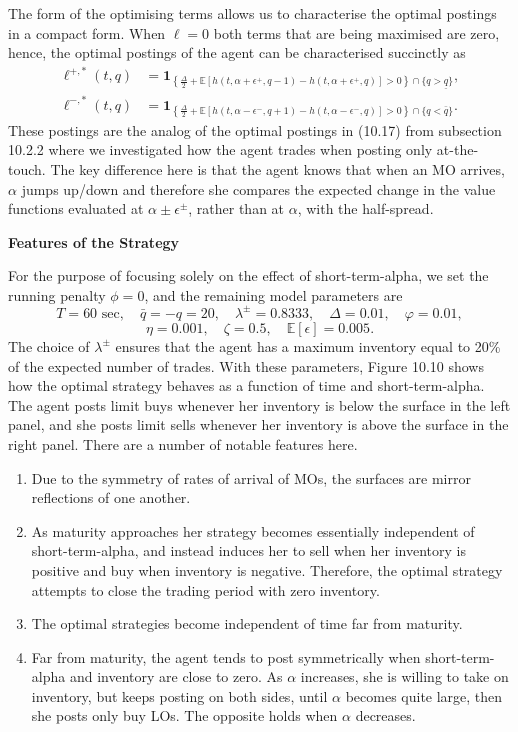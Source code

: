 \documentclass[11pt, a4paper]{book}
\newcommand{\E}{\mathbb{E}}
\newcommand{\Ind}{\mathbf{1}}
\begin{document}
	The form of the optimising terms allows us to characterise the optimal postings in a compact form. When $\ell = 0$ both terms that are being maximised are zero, hence, the optimal postings of the agent can be characterised succinctly as
	\begin{equation}
		\boxed{
			\begin{aligned}
				\ell^{+, *}(t, q) &= \Ind_{\left\{ \frac{\Delta}{2} + \E[h(t, \alpha + \epsilon^+, q-1) - h(t, \alpha + \epsilon^+, q)] > 0 \right\} \cap \{q > \underline{q}\}}, \\
				\ell^{-, *}(t, q) &= \Ind_{\left\{ \frac{\Delta}{2} + \E[h(t, \alpha - \epsilon^-, q+1) - h(t, \alpha - \epsilon^-, q)] > 0 \right\} \cap \{q < \bar{q}\}}.
			\end{aligned}
		} \label{eq:10.32}
	\end{equation}
	These postings are the analog of the optimal postings in (10.17) from subsection 10.2.2 where we investigated how the agent trades when posting only at-the-touch. The key difference here is that the agent knows that when an MO arrives, $\alpha$ jumps up/down and therefore she compares the expected change in the value functions evaluated at $\alpha \pm \epsilon^\pm$, rather than at $\alpha$, with the half-spread.
	
	\textbf{Features of the Strategy}
	
	For the purpose of focusing solely on the effect of short-term-alpha, we set the running penalty $\phi = 0$, and the remaining model parameters are
	\[
	T = 60 \text{ sec}, \quad \bar{q} = -q = 20, \quad \lambda^\pm = 0.8333, \quad \Delta = 0.01, \quad \varphi = 0.01,
	\]
	\[
	\eta = 0.001, \quad \zeta = 0.5, \quad \E[\epsilon] = 0.005.
	\]
	The choice of $\lambda^\pm$ ensures that the agent has a maximum inventory equal to 20\% of the expected number of trades. With these parameters, Figure 10.10 shows how the optimal strategy behaves as a function of time and short-term-alpha. The agent posts limit buys whenever her inventory is below the surface in the left panel, and she posts limit sells whenever her inventory is above the surface in the right panel. There are a number of notable features here.
	\begin{enumerate}
		\item[(i)] Due to the symmetry of rates of arrival of MOs, the surfaces are mirror reflections of one another.
		\item[(ii)] As maturity approaches her strategy becomes essentially independent of short-term-alpha, and instead induces her to sell when her inventory is positive and buy when inventory is negative. Therefore, the optimal strategy attempts to close the trading period with zero inventory.
		\item[(iii)] The optimal strategies become independent of time far from maturity.
		\item[(iv)] Far from maturity, the agent tends to post symmetrically when short-term-alpha and inventory are close to zero. As $\alpha$ increases, she is willing to take on inventory, but keeps posting on both sides, until $\alpha$ becomes quite large, then she posts only buy LOs. The opposite holds when $\alpha$ decreases.
	\end{enumerate}
	
\end{document}
